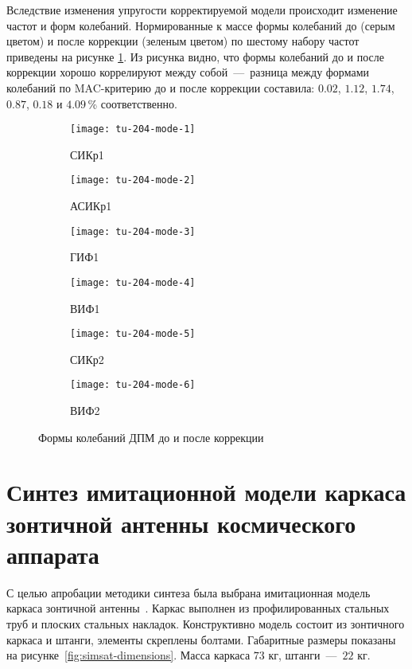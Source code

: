 Вследствие изменения упругости корректируемой модели происходит изменение частот и форм колебаний. Нормированные к массе формы колебаний до (серым цветом) и после коррекции (зеленым цветом) по шестому набору частот приведены на рисунке \ref{fig:tu-204-modes}. Из рисунка видно, что формы колебаний до и после коррекции хорошо коррелируют между собой~---~разница между формами колебаний по MAC-критерию до и после коррекции составила: $ 0.02 $, $ 1.12 $, $ 1.74 $, $ 0.87 $, $ 0.18 $ и $ 4.09 $\,\% соответственно.

\def\sfTu204Mode{0.32\textwidth}

\begin{figure}[H]
	\centering
	\begin{subfigure}[b]{\sfTu204Mode}
		\centering
		\texttt{[image: tu-204-mode-1]}
		\caption{СИКр1} 
	\end{subfigure}
	\begin{subfigure}[b]{\sfTu204Mode}
		\centering
		\texttt{[image: tu-204-mode-2]}
		\caption{АСИКр1}
	\end{subfigure}
	\begin{subfigure}[b]{\sfTu204Mode}
		\centering
		\texttt{[image: tu-204-mode-3]}
		\caption{ГИФ1}
	\end{subfigure}	
	\begin{subfigure}[b]{\sfTu204Mode}
		\centering
		\texttt{[image: tu-204-mode-4]}
		\caption{ВИФ1}
	\end{subfigure}	
	\begin{subfigure}[b]{\sfTu204Mode}
		\centering
		\texttt{[image: tu-204-mode-5]}
		\caption{СИКр2}
	\end{subfigure}
	\begin{subfigure}[b]{\sfTu204Mode}
		\centering
		\texttt{[image: tu-204-mode-6]}
		\caption{ВИФ2} 
	\end{subfigure}
	\caption{Формы колебаний ДПМ до и после коррекции} \label{fig:tu-204-modes}
\end{figure}

\section{Синтез имитационной модели каркаса зонтичной антенны космического аппарата} \label{struct:synthesisApprobation}

С целью апробации методики синтеза была выбрана имитационная модель каркаса зонтичной антенны~. Каркас выполнен из профилированных стальных труб и плоских стальных накладок. Конструктивно модель состоит из зонтичного каркаса и штанги, элементы скреплены болтами. Габаритные размеры показаны на рисунке~\ref{fig:simsat-dimensions}. Масса каркаса $ 73 $ кг, штанги~---~$ 22 $ кг.

